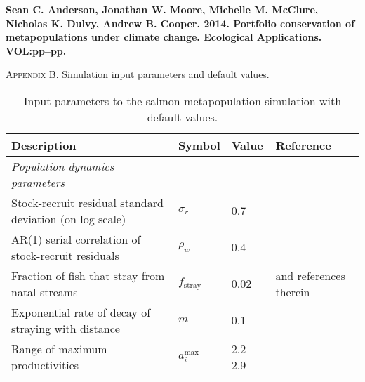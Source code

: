 \documentclass[12pt]{article}
\begin{document}
\textbf{Sean C. Anderson, Jonathan W. Moore, Michelle M. McClure, Nicholas K. Dulvy, Andrew B. Cooper. 2014. Portfolio conservation of metapopulations under climate change. Ecological Applications. VOL:pp--pp.}

\bigskip

\textsc{Appendix B.} Simulation input parameters and default values.

\bigskip

\begin{table}[h!]
\centering
\footnotesize
\caption{Input parameters to the salmon metapopulation simulation with default values.}
\smallskip
\begin{tabular}{>{\RaggedRight}p{7.8cm}p{1.1cm}p{2.5cm}>{\RaggedRight}p{3.3cm}}
\toprule
Description                                                          & Symbol                & Value                  & Reference  \\
\midrule

\textit{Population dynamics parameters}                              &                       &                        &             \\
Stock-recruit residual standard deviation (on log scale)             & $\sigma_r$            & 0.7                    & \citep{thorson2014a}  \\
AR(1) serial correlation of stock-recruit residuals                  & $\rho_w$              & 0.4                    & \citep{thorson2014a}  \\
Fraction of fish that stray from natal streams                       & $f_{\mathrm{stray}}$  & 0.02                   & \citep{quinn2005} and references therein  \\
Exponential rate of decay of straying with distance                  & $m$                   & 0.1                    & \citep{cooper1999}      \\
Range of maximum productivities                                      & $a_i^{\mathrm{max}}$  & 2.2--2.9             &  \citep{dorner2008}   \\


\end{tabular}
\end{table}
\end{document}
